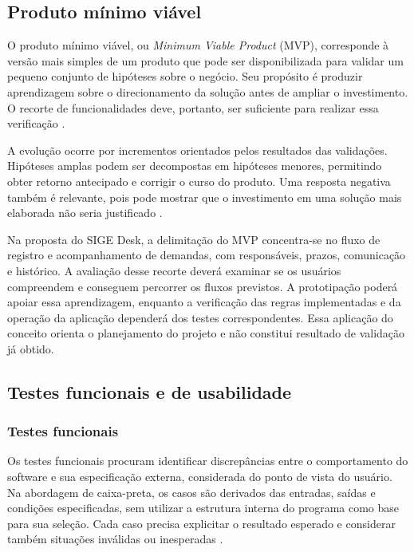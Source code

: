\subsection{\esp Produto mínimo viável}

O produto mínimo viável, ou \textit{Minimum Viable Product} (MVP), corresponde à versão mais simples de um produto que pode ser disponibilizada para validar um pequeno conjunto de hipóteses sobre o negócio. Seu propósito é produzir aprendizagem sobre o direcionamento da solução antes de ampliar o investimento. O recorte de funcionalidades deve, portanto, ser suficiente para realizar essa verificação \cite{CAROLI_2015}.

A evolução ocorre por incrementos orientados pelos resultados das validações. Hipóteses amplas podem ser decompostas em hipóteses menores, permitindo obter retorno antecipado e corrigir o curso do produto. Uma resposta negativa também é relevante, pois pode mostrar que o investimento em uma solução mais elaborada não seria justificado \cite{CAROLI_2015}.

Na proposta do SIGE Desk, a delimitação do MVP concentra-se no fluxo de registro e acompanhamento de demandas, com responsáveis, prazos, comunicação e histórico. A avaliação desse recorte deverá examinar se os usuários compreendem e conseguem percorrer os fluxos previstos. A prototipação poderá apoiar essa aprendizagem, enquanto a verificação das regras implementadas e da operação da aplicação dependerá dos testes correspondentes. Essa aplicação do conceito orienta o planejamento do projeto e não constitui resultado de validação já obtido.

\subsection{\esp Testes funcionais e de usabilidade}

\subsubsection{\esp Testes funcionais}

Os testes funcionais procuram identificar discrepâncias entre o comportamento do software e sua especificação externa, considerada do ponto de vista do usuário. Na abordagem de caixa-preta, os casos são derivados das entradas, saídas e condições especificadas, sem utilizar a estrutura interna do programa como base para sua seleção. Cada caso precisa explicitar o resultado esperado e considerar também situações inválidas ou inesperadas \cite{MYERS_SANDLER_BADGETT_2012}.

